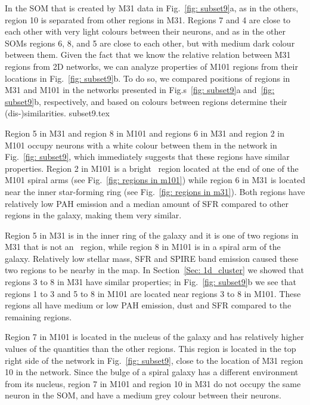     In the SOM that is created by M31 data in Fig.~\ref{fig: subset9}a, as in the others, region 10 is separated from other regions in M31.
    Regions 7 and 4 are close to each other with very light colours between their neurons, and as in the other SOMs regions 6, 8, and 5 are close to each other, but with medium dark colour between them.
    Given the fact that we know the relative relation between M31 regions from 2D networks, we can analyze properties of M101 regions from their locations in Fig.~\ref{fig: subset9}b.
    To do so, we compared positions of regions in M31 and M101 in the networks presented in Fig.s~\ref{fig: subset9}a and~\ref{fig: subset9}b, respectively, and based on colours between regions determine their (dis-)similarities.
    {subset9.tex}
    
    Region 5 in M31 and region 8 in M101 and regions 6 in M31 and region 2 in M101 occupy neurons with a white colour between them in the network in Fig.~\ref{fig: subset9}, which immediately suggests that these regions have similar properties. 
    Region 2 in M101 is a bright \hii~region located at the end of  one of the M101 spiral arms (see Fig.~\ref{fig: regions in m101}) while
    region 6 in M31 is located near the inner star-forming ring (see Fig.~\ref{fig: regions in m31}).
    Both regions have relatively low PAH emission and a median amount of  SFR compared to other regions in the galaxy, making them very similar.
    
    Region 5 in M31 is in the inner ring of the galaxy and it is one of two regions in M31 that is not an  \hii~region, while
    region 8 in M101 is in a spiral arm of the galaxy.
    Relatively low stellar mass, SFR and SPIRE band emission caused these two regions to be nearby in the map.
    In Section~\ref{Sec: 1d_cluster} we showed that regions 3 to 8 in M31 have similar properties; in Fig.~\ref{fig: subset9}b we see that regions 1 to 3 and 5 to 8 in M101 are located near regions 3 to 8 in M101. 
    These regions all have medium or low PAH emission, dust and SFR compared to the remaining regions.
    
    Region 7 in M101 is located in the nucleus of the galaxy and has relatively higher values of the quantities than the other regions.
    This region is located in the top right side of the network in Fig.~\ref{fig: subset9}, close to the location of M31 region 10 in the network.
    Since the bulge of a spiral galaxy has a different environment from its nucleus, region 7 in M101 and region 10 in M31 do not occupy the same neuron in the SOM, and have a medium grey colour between their neurons.

